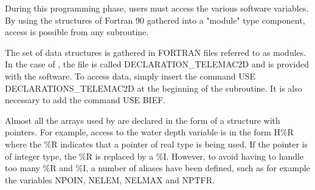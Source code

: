  During this programming phase, users must access the various software variables. By using the structures of Fortran 90 gathered into a "module" type component, access is possible from any subroutine.

 The set of data structures is gathered in FORTRAN files referred to as modules. In the case of , the file is called DECLARATION\_TELEMAC2D and is provided with the software. To access  data, simply insert the command USE DECLARATIONS\_TELEMAC2D at the beginning of the subroutine. It is also necessary to add the command USE BIEF.  



 Almost all the arrays used by  are declared in the form of a structure with pointers. For example, access to the water depth variable is in the form H\%R where the \%R indicates that a pointer of real type is being used. If the pointer is of integer type, the \%R is replaced by a \%I. However, to avoid having to handle too many \%R and \%I, a number of aliases have been defined, such as for example the variables NPOIN, NELEM, NELMAX and NPTFR.

